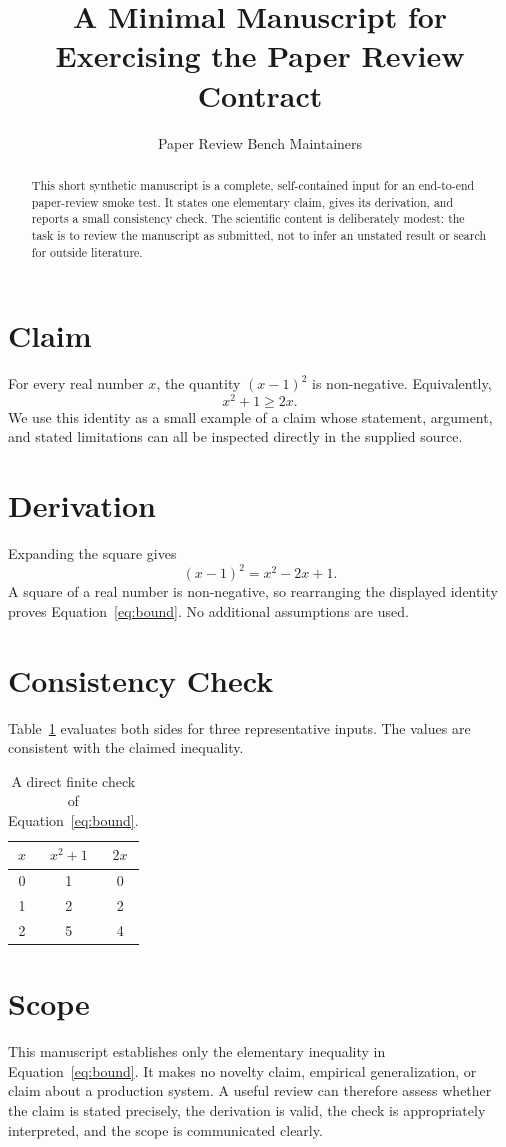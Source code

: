 \documentclass[11pt]{article}
\title{A Minimal Manuscript for Exercising the Paper Review Contract}
\author{Paper Review Bench Maintainers}
\date{}
\begin{document}
\maketitle

\begin{abstract}
This short synthetic manuscript is a complete, self-contained input for an
end-to-end paper-review smoke test. It states one elementary claim, gives its
derivation, and reports a small consistency check. The scientific content is
deliberately modest: the task is to review the manuscript as submitted, not to
infer an unstated result or search for outside literature.
\end{abstract}

\section{Claim}\label{sec:claim}
For every real number $x$, the quantity $(x-1)^2$ is non-negative. Equivalently,
\begin{equation}\label{eq:bound}
x^2 + 1 \geq 2x.
\end{equation}
We use this identity as a small example of a claim whose statement, argument,
and stated limitations can all be inspected directly in the supplied source.

\section{Derivation}\label{sec:derivation}
Expanding the square gives
\[
(x-1)^2 = x^2 - 2x + 1.
\]
A square of a real number is non-negative, so rearranging the displayed
identity proves Equation~\ref{eq:bound}. No additional assumptions are used.

\section{Consistency Check}\label{sec:check}
Table~\ref{tab:values} evaluates both sides for three representative inputs.
The values are consistent with the claimed inequality.

\begin{table}[h]
\centering
\begin{tabular}{c|c|c}
$x$ & $x^2 + 1$ & $2x$ \\
\hline
0 & 1 & 0 \\
1 & 2 & 2 \\
2 & 5 & 4 \\
\end{tabular}
\caption{A direct finite check of Equation~\ref{eq:bound}.}
\label{tab:values}
\end{table}

\section{Scope}\label{sec:scope}
This manuscript establishes only the elementary inequality in
Equation~\ref{eq:bound}. It makes no novelty claim, empirical generalization,
or claim about a production system. A useful review can therefore assess
whether the claim is stated precisely, the derivation is valid, the check is
appropriately interpreted, and the scope is communicated clearly.
\end{document}
